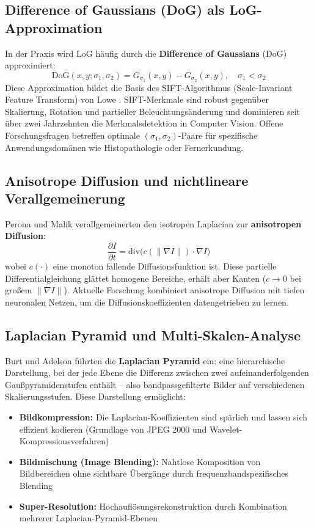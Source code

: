 ﻿\documentclass[a4paper,12pt]{article}
\theoremstyle{definition}
\begin{document}
\subsection{Difference of Gaussians (DoG) als LoG-Approximation}

In der Praxis wird LoG häufig durch die \textbf{Difference of Gaussians} (DoG) approximiert:
\[
    \text{DoG}(x,y;\sigma_1,\sigma_2) = G_{\sigma_1}(x,y) - G_{\sigma_2}(x,y), \quad \sigma_1 < \sigma_2
\]
Diese Approximation bildet die Basis des SIFT-Algorithmus (Scale-Invariant Feature Transform) von
Lowe \cite{lowe2004}. SIFT-Merkmale sind robust gegenüber Skalierung, Rotation und partieller
Beleuchtungsänderung und dominieren seit über zwei Jahrzehnten die Merkmalsdetektion in Computer Vision.
Offene Forschungsfragen betreffen optimale $(\sigma_1, \sigma_2)$-Paare für spezifische Anwendungsdomänen
wie Histopathologie oder Fernerkundung.

\subsection{Anisotrope Diffusion und nichtlineare Verallgemeinerung}

Perona und Malik \cite{perona1990} verallgemeinerten den isotropen Laplacian zur \textbf{anisotropen
Diffusion}:
\[
    \frac{\partial I}{\partial t} = \mathrm{div}\bigl(c(\|\nabla I\|) \cdot \nabla I\bigr)
\]
wobei $c(\cdot)$ eine monoton fallende Diffusionsfunktion ist. Diese partielle Differentialgleichung
glättet homogene Bereiche, erhält aber Kanten ($c \to 0$ bei großem $\|\nabla I\|$). Aktuelle
Forschung kombiniert anisotrope Diffusion mit tiefen neuronalen Netzen, um die Diffusionskoeffizienten
datengetrieben zu lernen.

\subsection{Laplacian Pyramid und Multi-Skalen-Analyse}

Burt und Adelson \cite{burt1983} führten die \textbf{Laplacian Pyramid} ein: eine hierarchische
Darstellung, bei der jede Ebene die Differenz zwischen zwei aufeinanderfolgenden Gaußpyramidenstufen
enthält -- also bandpassgefilterte Bilder auf verschiedenen Skalierungsstufen. Diese Darstellung
ermöglicht:
\begin{itemize}
    \item \textbf{Bildkompression:} Die Laplacian-Koeffizienten sind spärlich und lassen sich
          effizient kodieren (Grundlage von JPEG 2000 und Wavelet-Kompressionsverfahren)
    \item \textbf{Bildmischung (Image Blending):} Nahtlose Komposition von Bildbereichen ohne
          sichtbare Übergänge durch frequenzbandspezifisches Blending
    \item \textbf{Super-Resolution:} Hochauflösungsrekonstruktion durch Kombination mehrerer
          Laplacian-Pyramid-Ebenen
\end{itemize}
\end{document}
